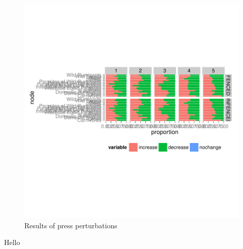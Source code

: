 \documentclass[12pt]{article}
\begin{document}





\begin{landscape}
\begin{figure}
\begin{center}
\includegraphics{plots-fig}
\end{center}
\caption{Results of press perturbations}
\label{fig:one}
\end{figure}
\end{landscape}

Hello
\end{document}
